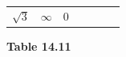 {{\begin{center}
\begin{xtabular}[t]{|l|l|l|l|l|l|l|}
    
        
                  \begin{math}\sqrt{3}\end{math}
                 &
    
    
        
                  \begin{math}\infty \end{math}
                 &
    
    
        0%
     \tabularnewline{}
    \end{xtabular}
      \end{center}
    \begin{center}{\small\bfseries Table 14.11}\end{center}
    
    \addtocounter{footnote}{-0}
    
          } %
        }{%
        }
